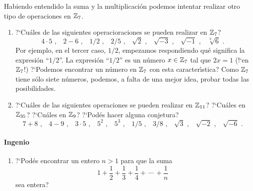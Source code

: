 Habiendo entendido la suma y la multiplicaci\'on podemos intentar
realizar otro tipo de operaciones en $\mathbb Z_7$.

\begin{enumerate}[label=P\arabic*]
	\conti
	\item\label{item:otras-operaciones}
		?`Cu\'ales de las siguientes operacioraciones se pueden
		realizar en $\mathbb Z_7$?
		\begin{displaymath}
			4\cdot 5
			\text{ ,}\quad
			2-6
			\text{ ,}\quad
			1/2
			\text{ ,}\quad
			2/5
			\text{ ,}\quad
			\sqrt 2
			\text{ ,}\quad
			\sqrt{-3}
			\text{ ,}\quad
			\sqrt{-1}
			\text{ ,}\quad
			\sqrt[3] 6
			\text{ .}
		\end{displaymath}
		Por ejemplo, en el tercer caso, $1/2$, empezamos
		respondiendo qu\'e significa la expresi\'on ``$1/2$''.
		La expresi\'on ``$1/2$'' es un n\'umero $x\in\mathbb Z_7$ tal
		que $2x=1$ (!`en $\mathbb Z_7$!) ?`Podemos encontrar un
		n\'umero en $\mathbb Z_7$ con esta caracter\'{\i}stica?
		Como $\mathbb Z_7$ tiene s\'olo siete n\'umeros, podemos,
		a falta de una mejor idea, probar todas las posibilidades.
	\item\label{item:otros-modulos}
		?`Cu\'ales de las siguientes operaciones se pueden
		realizar en $\mathbb Z_{11}$? ?`Cu\'ales en $\mathbb Z_{35}$?
		?`Cu\'ales en $\mathbb Z_9$? ?`Pod\'es hacer alguna conjetura?
		\begin{displaymath}
			7+8
			\text{ ,}\quad
			4-9
			\text{ ,}\quad
			3\cdot 5
			\text{ ,}\quad
			5^2
			\text{ ,}\quad
			5^3
			\text{ ,}\quad
			1/5
			\text{ ,}\quad
			3/8
			\text{ ,}\quad
			\sqrt 3
			\text{ ,}\quad
			\sqrt{-2}
			\text{ ,}\quad
			\sqrt{-6}
			\text{ .}
		\end{displaymath}
	\seti
\end{enumerate}
%


\paragraph{Ingenio}
\begin{enumerate}[label=P\arabic*]
	\conti
	\item\label{item:reciprocos}
		?`Pod\'es encontrar un entero $n>1$ para que la suma
		\begin{displaymath}
			1+\frac 1 2 +\frac 1 3 +\frac 1 4 +\,\cdots\,+
				\frac 1 n
		\end{displaymath}
		sea entera?
\end{enumerate}
%

